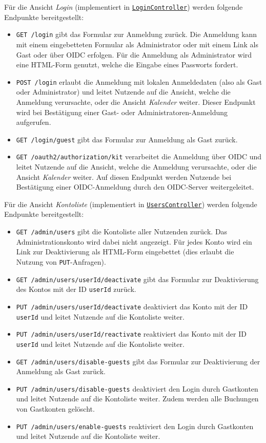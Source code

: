 Für die Ansicht \textit{Login} (implementiert in \hyperref[edu.kit.hci.soli.controller.LoginController]{\texttt{LoginController}}) werden folgende Endpunkte bereitgestellt:
\begin{itemize}
    \item \texttt{GET /login} gibt das Formular zur Anmeldung zurück. Die Anmeldung kann mit einem eingebetteten Formular als Administrator oder mit einem Link als Gast oder über \gls{OIDC} erfolgen.
          Für die Anmeldung als Administrator wird eine \gls{HTML-Form} genutzt, welche die Eingabe eines Passworts fordert.
    \item \texttt{POST /login} erlaubt die Anmeldung mit lokalen Anmeldedaten (also als Gast oder Administrator) und leitet Nutzende auf die Ansicht, welche die Anmeldung verursachte, oder die Ansicht \textit{Kalender} weiter.
          Dieser Endpunkt wird bei Bestätigung einer Gast- oder Administratoren-Anmeldung aufgerufen.
    \item \texttt{GET /login/guest} gibt das Formular zur Anmeldung als Gast zurück.
    \item \texttt{GET /oauth2/authorization/kit} verarbeitet die Anmeldung über \gls{OIDC} und leitet Nutzende auf die Ansicht, welche die Anmeldung verursachte, oder die Ansicht \textit{Kalender} weiter.
          Auf diesen Endpunkt werden Nutzende bei Bestätigung einer \gls{OIDC}-Anmeldung durch den OIDC-Server weitergeleitet.
\end{itemize}

Für die Ansicht \textit{Kontoliste} (implementiert in \hyperref[edu.kit.hci.soli.controller.UsersController]{\texttt{UsersController}}) werden folgende Endpunkte bereitgestellt:
\begin{itemize}
    \item \texttt{GET /admin/users} gibt die Kontoliste aller Nutzenden zurück. Das Administrationskonto wird dabei nicht angezeigt.
          Für jedes Konto wird ein Link zur Deaktivierung als \gls{HTML-Form} eingebettet (dies erlaubt die Nutzung von \texttt{PUT}-Anfragen).
    \item \texttt{GET /admin/users/{userId}/deactivate} gibt das Formular zur Deaktivierung des Kontos mit der ID \texttt{userId} zurück.
    \item \texttt{PUT /admin/users/{userId}/deactivate} deaktiviert das Konto mit der ID \texttt{userId} und leitet Nutzende auf die Kontoliste weiter.
    \item \texttt{PUT /admin/users/{userId}/reactivate} reaktiviert das Konto mit der ID \texttt{userId} und leitet Nutzende auf die Kontoliste weiter.
    \item \texttt{GET /admin/users/disable-guests} gibt das Formular zur Deaktivierung der Anmeldung als Gast zurück.
    \item \texttt{PUT /admin/users/disable-guests} deaktiviert den Login durch Gastkonten und leitet Nutzende auf die Kontoliste weiter.
          Zudem werden alle Buchungen von Gastkonten gelöscht.
    \item \texttt{PUT /admin/users/enable-guests} reaktiviert den Login durch Gastkonten und leitet Nutzende auf die Kontoliste weiter.
\end{itemize}

